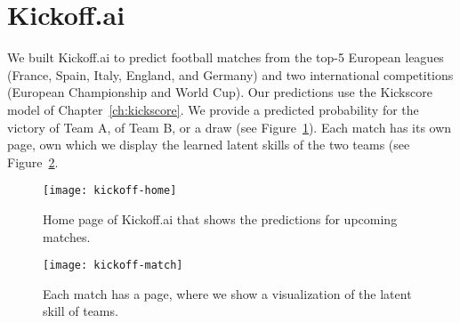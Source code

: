 \section{Kickoff.ai}
\label{app:kks:kickoffai}

We built Kickoff.ai to predict football matches from the top-5 European leagues (France, Spain, Italy, England, and Germany) and two international competitions (European Championship and World Cup).
Our predictions use the Kickscore model of Chapter~\ref{ch:kickscore}.
We provide a predicted probability for the victory of Team A, of Team B, or a draw (see Figure~\ref{app:fig:kickoff-home}).
Each match has its own page, own which we display the learned latent skills of the two teams (see Figure~\ref{app:fig:kickoff-match}.

\begin{figure}
	\centering
	\texttt{[image: kickoff-home]}
	\caption{Home page of Kickoff.ai that shows the predictions for upcoming matches.}
	\label{app:fig:kickoff-home}
\end{figure}

\begin{figure}
	\centering
	\texttt{[image: kickoff-match]}
	\caption{Each match has a page, where we show a visualization of the latent skill of teams.}
	\label{app:fig:kickoff-match}
\end{figure}
